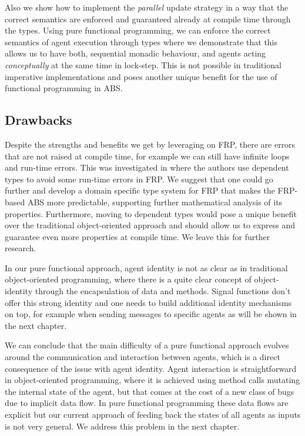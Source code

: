 Also we show how to implement the \textit{parallel} update strategy \cite{thaler_art_2017} in a way that the correct semantics are enforced and guaranteed already at compile time through the types. Using pure functional programming, we can enforce the correct semantics of agent execution through types where we demonstrate that this allows us to have both, sequential monadic behaviour, and agents acting \textit{conceptually} at the same time in lock-step. This is not possible in traditional imperative implementations and poses another unique benefit for the use of functional programming in ABS.

\subsection{Drawbacks}
Despite the strengths and benefits we get by leveraging on FRP, there are errors that are not raised at compile time, for example we can still have infinite loops and run-time errors. This was investigated in \cite{sculthorpe_safe_2009} where the authors use dependent types to avoid some run-time errors in FRP. We suggest that one could go further and develop a domain specific type system for FRP that makes the FRP-based ABS more predictable, supporting further mathematical analysis of its properties. Furthermore, moving to dependent types would pose a unique benefit over the traditional object-oriented approach and should allow us to express and guarantee even more properties at compile time. We leave this for further research.

In our pure functional approach, agent identity is not as clear as in traditional object-oriented programming, where there is a quite clear concept of object-identity through the encapsulation of data and methods. Signal functions don't offer this strong identity and one needs to build additional identity mechanisms on top, for example when sending messages to specific agents as will be shown in the next chapter.

We can conclude that the main difficulty of a pure functional approach evolves around the communication and interaction between agents, which is a direct consequence of the issue with agent identity. Agent interaction is straightforward in object-oriented programming, where it is achieved using method calls mutating the internal state of the agent, but that comes at the cost of a new class of bugs due to implicit data flow. In pure functional programming these data flows are explicit but our current approach of feeding back the states of all agents as inputs is not very general. We address this problem in the next chapter.

